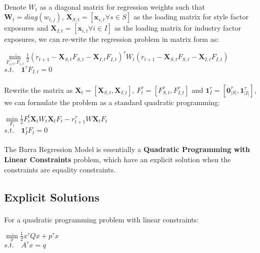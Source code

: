 \documentclass{article}
\begin{document}
\paragraph{}Denote $W_{t}$ as a diagonal matrix for regression weights such that $\mathbf{W}_{t} = diag(w_{t,j})$, $\mathbf{X}_{S,t} = [\mathbf{x}_{s,t} \forall s \in S]$ as the loading matrix for style factor exposures and $\mathbf{X}_{I,t} = [\mathbf{x}_{i, t}  \forall i \in I]$ as the loading matrix for industry factor exposures, we can re-write the regression problem in matrix form as:
\begin{center}
    $\min\limits_{F_{s,t}, F_{i,t}} \frac{1}{2} (r_{t+1} -\mathbf{X}_{S,t} F_{S,t}-\mathbf{X}_{I,t} F_{I,t})^{\tau} W_{t}  (r_{t+1} -\mathbf{X}_{S,t} F_{S,t}-\mathbf{X}_{I,t} F_{I,t})$ \\
    $s.t.\quad \mathbf{1}^{\tau} F_{I,t} = 0$

\end{center}
\paragraph{}Rewrite the matrix as $\mathbf{X}_{t} = [\mathbf{X}_{S,t}, \mathbf{X}_{I,t}]$, $F_{t}^{\tau} = [F_{S,t}^{\tau}, F_{I,t}^{\tau}]$ and $\textbf{1}_{I}^{\tau} = [\textbf{0}_{|S|}^{\tau},\textbf{1}_{|I|}^{\tau}]$, we can formulate the problem as a standard quadratic programming:
\begin{center}
    $\min\limits_{F_{t}} \frac{1}{2}F_{t}^{t}\mathbf{X}_{t}W_{t}\mathbf{X}_{t}F_{t} - r_{t+1}^{\tau}W\mathbf{X}_{t}F_{t}$\\
    $s.t. \quad \textbf{1}_{I}^{\tau} F_{t} = 0$
\end{center}
\paragraph{}The Barra Regression Model is essentially a \textbf{Quadratic Programming with Linear Constraints} problem, which have an explicit solution when the constraints are equality constraints.
\subsection{Explicit Solutions}
\paragraph{}For a quadratic programming problem with linear constraints:
\begin{center}
    $\min\limits_{x} \frac{1}{2}x^{\tau}Qx + p^{\tau}x$\\
    $s.t. \quad A^{\tau}x = q$
\end{center}
\end{document}
